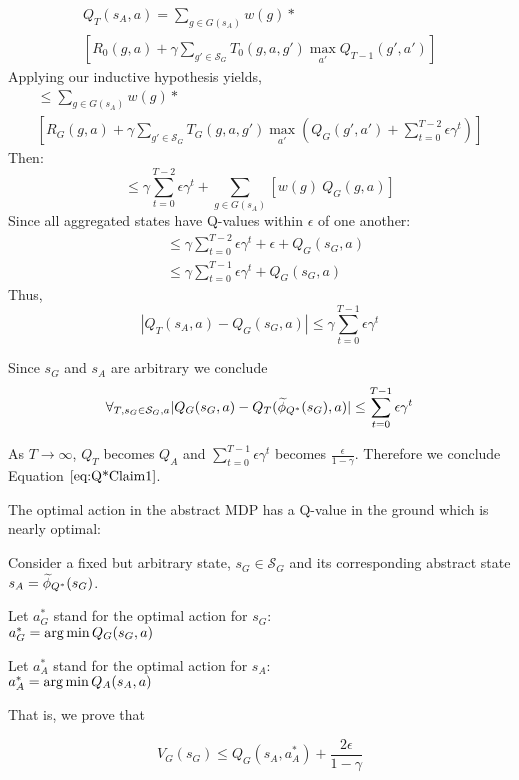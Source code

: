 \begin{multline*}
Q_T(s_A, a) = \sum_{g \in G(s_A)}w(g)* \\ 
 \left[ R_0(g,a) + \gamma \sum_{g' \in \mathcal{S}_G} T_0(g,a,g') \max_{a'} Q_{T-1}(g', a')      \right]
\end{multline*}
Applying our inductive hypothesis yields,
\begin{multline*}
\leq \sum_{g \in G(s_A)}w(g) * \\ \left[ R_G(g,a) + \gamma \sum_{g' \in \mathcal{S}_G} T_G(g,a,g') \max_{a'}(Q_G(g', a') + \sum_{t=0}^{T-2} \epsilon \gamma^t)      \right]
\end{multline*}
Then:
\begin{equation*}
\leq \gamma\sum_{t=0}^{T-2} \epsilon \gamma^t + \sum_{g \in G(s_A)}\left[ w(g)\ Q_G(g,a)\right]
\end{equation*}
Since all aggregated states have Q-values within $\epsilon$ of one another:
\begin{align*}
&\leq \gamma\sum_{t=0}^{T-2} \epsilon \gamma^t + \epsilon + Q_G(s_G, a)\\
&\leq \gamma\sum_{t=0}^{T-1} \epsilon \gamma^t + Q_G(s_G, a)
\end{align*}
Thus,
\begin{equation*}
\left| Q_{T}(s_A, a) - Q_G(s_G,a) \right| \leq \gamma\sum_{t=0}^{T-1}\epsilon \gamma^t
\end{equation*}

Since $s_G$ and $s_A$ are arbitrary we conclude
\begin{equation}
\forall_{T, s_G \in \mathcal{S}_G, a} |Q_G(s_G, a) - Q_T(\widetilde \phi_{Q^*}(s_G), a)| \leq \sum_{t=0}^{T-1} \epsilon \gamma^t
\end{equation}

As $T \rightarrow \infty$, $Q_T$ becomes $Q_A$ and $\sum_{t=0}^{T-1} \epsilon \gamma^t$ becomes $\frac{\epsilon}{1-\gamma}$. Therefore we conclude Equation $\ref{eq:Q*Claim1}$.



\begin{clm}
\label{clm:optAbsActionNearOptGround}
The optimal action in the abstract MDP has a Q-value in the ground which is nearly optimal:

Consider a fixed but arbitrary state, $s_G \in \mathcal{S}_G$ and its corresponding abstract state $s_A=\widetilde \phi_{Q^*}(s_G)$.

Let $a^*_G$ stand for the optimal action for $s_G$: \\
$a^*_G = \operatorname*{arg\,min} Q_G(s_G, a)$

Let $a^*_A$ stand for the optimal action for $s_A$:\\
 $a^*_A = \operatorname*{arg\,min} Q_A(s_A, a)$

That is, we prove that

\begin{equation}
\label{eq:Q*Claim2}
V_G(s_G) \leq Q_G(s_A, a^*_A) + \frac{2\epsilon}{1-\gamma}
\end{equation}
\end{clm}

